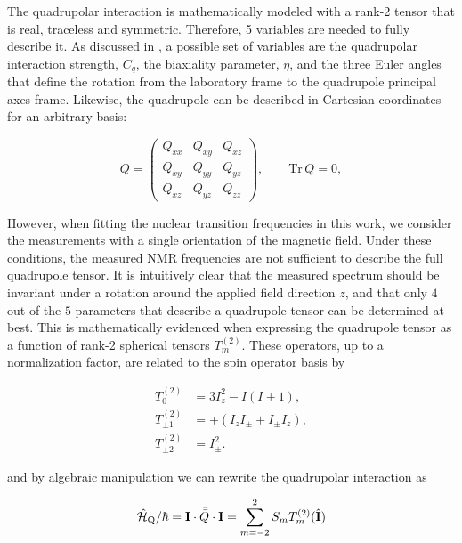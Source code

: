 The quadrupolar interaction is mathematically modeled with a rank-2 tensor that is real, traceless and symmetric. Therefore, 5 variables are needed to fully describe it. As discussed in , a possible set of variables are the quadrupolar interaction strength, $C_q$, the biaxiality parameter, $\eta$, and the three Euler angles that define the rotation from the laboratory frame to the quadrupole principal axes frame. Likewise, the quadrupole can be described in Cartesian coordinates for an arbitrary basis:

\begin{equation}
Q=\begin{pmatrix}
Q_{xx} & Q_{xy} & Q_{xz}\\
Q_{xy} & Q_{yy} & Q_{yz}\\
Q_{xz} & Q_{yz} & Q_{zz}
\end{pmatrix},\qquad \mathrm{Tr}\,Q=0,
\end{equation}

However, when fitting the nuclear transition frequencies in this work, we consider the measurements with a single orientation of the magnetic field. Under these conditions, the measured NMR frequencies are not sufficient to describe the full quadrupole tensor. It is intuitively clear that the measured spectrum should be invariant under a rotation around the applied field direction $z$, and that only $4$ out of the $5$ parameters that describe a quadrupole tensor can be determined at best. This is mathematically evidenced when expressing the quadrupole tensor as a function of rank-2 spherical tensors $T^{(2)}_{m}$. These operators, up to a normalization factor, are related to the spin operator basis by

\begin{equation}
\begin{split}
T^{(2)}_{0} &= 3 I_z^2 - I(I+1), \\
T^{(2)}_{\pm 1} &= \mp \left( I_z I_{\pm} + I_{\pm} I_z \right), \\
T^{(2)}_{\pm 2} &= I_{\pm}^2 .
\end{split}
\end{equation}

and by algebraic manipulation we can rewrite the quadrupolar interaction as

\begin{equation}
    \hat{\mathcal{H}}_{\text{Q}} / \hbar = \mathbf{I} \cdot \bar{\bar{Q}} \cdot \mathbf{I} = \sum_{m = -2}^2 S_m T^{(2)}_m(\hat{\mathbf{I}})
    \label{eq:quadrupole_spherical}
\end{equation}

